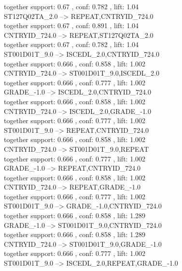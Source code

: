 \documentclass[12pt, a4paper, oneside]{ctexart}
\begin{document}
     together support: 0.67 , conf: 0.782 , lift: 1.04\\
   ST127Q02TA\_2.0 --> REPEAT,CNTRYID\_724.0 \\
    together support: 0.67 , conf: 0.891 , lift: 1.04\\
   CNTRYID\_724.0 --> REPEAT,ST127Q02TA\_2.0 \\
     together support: 0.67 , conf: 0.782 , lift: 1.04\\
   ST001D01T\_9.0 --> ISCEDL\_2.0,CNTRYID\_724.0 \\
     together support: 0.666 , conf: 0.858 , lift: 1.002\\
   CNTRYID\_724.0 --> ST001D01T\_9.0,ISCEDL\_2.0 \\
     together support: 0.666 , conf: 0.777 , lift: 1.002\\
   GRADE\_-1.0 --> ISCEDL\_2.0,CNTRYID\_724.0 \\
     together support: 0.666 , conf: 0.858 , lift: 1.002\\
   CNTRYID\_724.0 --> ISCEDL\_2.0,GRADE\_-1.0 \\
     together support: 0.666 , conf: 0.777 , lift: 1.002\\
   ST001D01T\_9.0 --> REPEAT,CNTRYID\_724.0 \\
     together support: 0.666 , conf: 0.858 , lift: 1.002\\
   CNTRYID\_724.0 --> ST001D01T\_9.0,REPEAT \\
     together support: 0.666 , conf: 0.777 , lift: 1.002\\
   GRADE\_-1.0 --> REPEAT,CNTRYID\_724.0 \\
     together support: 0.666 , conf: 0.858 , lift: 1.002\\
   CNTRYID\_724.0 --> REPEAT,GRADE\_-1.0 \\
     together support: 0.666 , conf: 0.777 , lift: 1.002\\
   ST001D01T\_9.0 --> GRADE\_-1.0,CNTRYID\_724.0 \\
    together support: 0.666 , conf: 0.858 , lift: 1.289\\
   GRADE\_-1.0 --> ST001D01T\_9.0,CNTRYID\_724.0 \\
    together support: 0.666 , conf: 0.858 , lift: 1.289\\
   CNTRYID\_724.0 --> ST001D01T\_9.0,GRADE\_-1.0 \\
     together support: 0.666 , conf: 0.777 , lift: 1.002\\
   ST001D01T\_9.0 --> ISCEDL\_2.0,REPEAT,GRADE\_-1.0 \\
\end{document}
